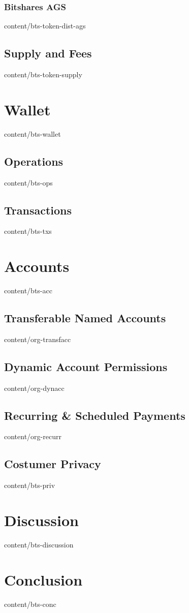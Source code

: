 \documentclass[conference,final,10pt,a4paper]{IEEEtran}
\begin{document}
\subsubsection { Bitshares AGS                   }  { content/bts-token-dist-ags } 
\subsection    { Supply and Fees                 }  { content/bts-token-supply   } 

\section       { Wallet                          }  { content/bts-wallet         } 
\subsection    { Operations                      }  { content/bts-ops            } 
\subsection    { Transactions                    }  { content/bts-txs            } 

\section       { Accounts                        }  { content/bts-acc            } 
\subsection    { Transferable Named Accounts     }  { content/org-transfacc      } 
\subsection    { Dynamic Account Permissions     }  { content/org-dynacc         } 
\subsection    { Recurring \& Scheduled Payments }  { content/org-recurr         } 
\subsection    { Costumer Privacy                }  { content/bts-priv           } 

\section       { Discussion                      }  { content/bts-discussion     } 

\section       { Conclusion                      }  { content/bts-conc           } 


\end{document}
